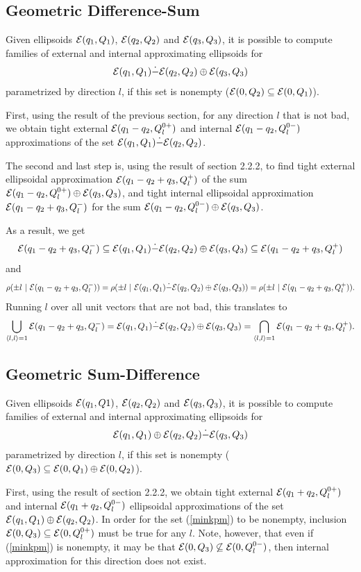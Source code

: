 \documentclass{report}
\newcommand{\EE}{{\cal E}}
\begin{document}
\subsection{Geometric Difference-Sum}
Given ellipsoids $\EE(q_1,Q_1)$, $\EE(q_2,Q_2)$ and $\EE(q_3,Q_3)$, it is
possible to compute families of external and internal approximating
ellipsoids for
\begin{equation}
\EE(q_1,Q_1) \dot{-} \EE(q_2,Q_2) \oplus \EE(q_3,Q_3) \label{minkmp}
\end{equation}
parametrized by direction $l$, if this set is nonempty
($\EE(0,Q_2)\subseteq\EE(0,Q_1)$).

First, using the result of the previous section, for any direction $l$ that
is not bad, we obtain tight external $\EE(q_1-q_2, Q_l^{0+})$ and internal
$\EE(q_1-q_2, Q_l^{0-})$ approximations of the set
$\EE(q_1,Q_1)\dot{-}\EE(q_2,Q_2)$.

The second and last step is, using the result of section 2.2.2, to find
tight external ellipsoidal approximation $\EE(q_1-q_2+q_3,Q_l^+)$ of the sum
$\EE(q_1-q_2,Q_l^{0+})\oplus\EE(q_3,Q_3)$, and tight internal ellipsoidal
approximation $\EE(q_1-q_2+q_3,Q_l^-)$ for the sum
$\EE(q_1-q_2,Q_l^{0-})\oplus\EE(q_3,Q_3)$.

As a result, we get
\[ \EE(q_1-q_2+q_3,Q_l^-) \subseteq
\EE(q_1,Q_1)\dot{-}\EE(q_2,Q_2)\oplus\EE(q_3,Q_3) \subseteq
\EE(q_1-q_2+q_3,Q_l^+) \]
and
\[ \rho(\pm l ~|~\EE(q_1-q_2+q_3,Q_l^-)) =
\rho(\pm l ~|~ \EE(q_1,Q_1)\dot{-}\EE(q_2,Q_2)\oplus\EE(q_3,Q_3)) =
\rho(\pm l ~|~ \EE(q_1-q_2+q_3,Q_l^+)). \]
Running $l$ over all unit vectors that are not bad, this translates to
\[ \bigcup_{\langle l,l\rangle=1} \EE(q_1-q_2+q_3,Q_l^-) =
\EE(q_1,Q_1)\dot{-}\EE(q_2,Q_2)\oplus\EE(q_3,Q_3) =
\bigcap_{\langle l,l\rangle=1} \EE(q_1-q_2+q_3,Q_l^+) .\]


\subsection{Geometric Sum-Difference}
Given ellipsoids $\EE(q_1,Q1)$, $\EE(q_2,Q_2)$ and $\EE(q_3,Q_3)$, it is
possible to compute families of external and internal approximating
ellipsoids for
\begin{equation}
\EE(q_1,Q_1) \oplus \EE(q_2,Q_2) \dot{-} \EE(q_3,Q_3) \label{minkpm}
\end{equation}
parametrized by direction $l$, if this set is nonempty
($\EE(0,Q_3)\subseteq\EE(0,Q_1)\oplus\EE(0,Q_2)$).

First, using the result of section 2.2.2, we obtain tight external
$\EE(q_1+q_2,Q_l^{0+})$ and internal $\EE(q_1+q_2,Q_l^{0-})$ ellipsoidal
approximations of the set $\EE(q_1,Q_1)\oplus\EE(q_2,Q_2)$.
In order for the set (\ref{minkpm}) to be nonempty, inclusion
$\EE(0,Q_3)\subseteq\EE(0,Q_l^{0+})$ must be true for any $l$.
Note, however, that even if (\ref{minkpm}) is nonempty, it may be that
$\EE(0,Q_3)\not\subseteq\EE(0,Q_l^{0-})$, then internal approximation for this
direction does not exist.
\end{document}
